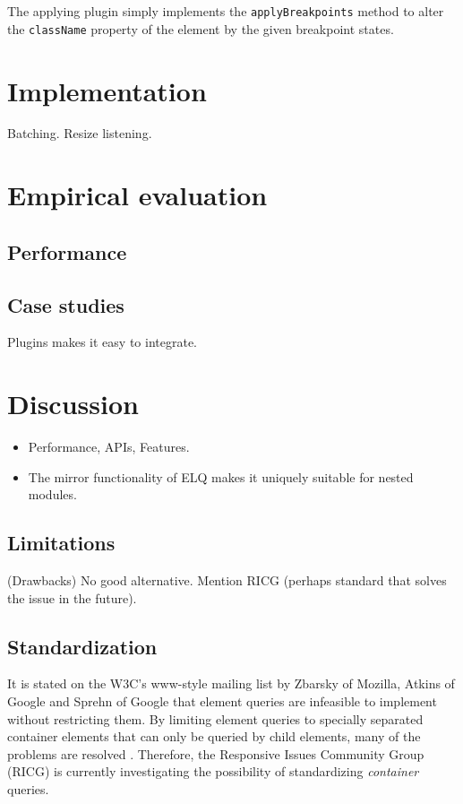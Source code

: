 \documentclass{acm_proc_article-sp}
\newcommand{\code}[1]{\texttt{#1}}
\newcommand{\elq}{ELQ}
\begin{document}
    The applying plugin simply implements the \code{applyBreakpoints} method to alter the \code{className} property of the element by the given breakpoint states.



\section{Implementation}
  Batching.
  Resize listening.

\section{Empirical evaluation}
  \subsection{Performance}
  \subsection{Case studies}
    Plugins makes it easy to integrate.



\section{Discussion}
  \begin{itemize}
    \item Performance, APIs, Features.
    \item The mirror functionality of \elq{} makes it uniquely suitable for nested modules.
  \end{itemize}

  \subsection{Limitations}
    (Drawbacks)
    No good alternative.
    Mention RICG (perhaps standard that solves the issue in the future).


  \subsection{Standardization}
    It is stated on the W3C's www-style mailing list \cite{w3c_eq_mail} by Zbarsky of Mozilla, Atkins of Google and Sprehn of Google that element queries are infeasible to implement without restricting them.
    By limiting element queries to specially separated container elements that can only be queried by child elements, many of the problems are resolved \cite{ricg_irc_log,ricg_issue_viewport}.
    Therefore, the Responsive Issues Community Group (RICG) is currently investigating the possibility of standardizing \emph{container} queries.
\end{document}
